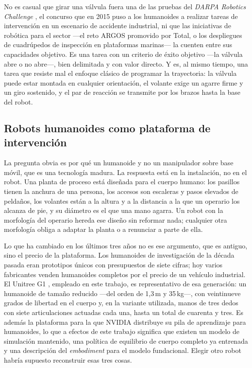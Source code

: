 No es casual que girar una válvula fuera una de las pruebas del \textit{DARPA Robotics Challenge}
\cite{krotkov2017drc}, el concurso que en 2015 puso a los humanoides a realizar tareas de
intervención en un escenario de accidente industrial, ni que las iniciativas de robótica para el
sector —el reto ARGOS promovido por Total, o los despliegues de cuadrúpedos de inspección en
plataformas marinas— la cuenten entre sus capacidades objetivo. Es una tarea con un criterio de
éxito objetivo —la válvula abre o no abre—, bien delimitada y con valor directo. Y es, al mismo
tiempo, una tarea que resiste mal el enfoque clásico de programar la trayectoria: la válvula puede
estar montada en cualquier orientación, el volante exige un agarre firme y un giro sostenido, y el
par de reacción se transmite por los brazos hasta la base del robot.

\subsection{Robots humanoides como plataforma de intervención}

La pregunta obvia es por qué un humanoide y no un manipulador sobre base móvil, que es una
tecnología madura. La respuesta está en la instalación, no en el robot. Una planta de proceso está
diseñada para el cuerpo humano: los pasillos tienen la anchura de una persona, los accesos son
escaleras y pasos elevados de peldaños, los volantes están a la altura y a la distancia a la que un
operario los alcanza de pie, y su diámetro es el que una mano agarra. Un robot con la morfología del
operario hereda ese diseño sin reformar nada; cualquier otra morfología obliga a adaptar la planta o
a renunciar a parte de ella.

Lo que ha cambiado en los últimos tres años no es ese argumento, que es antiguo, sino el precio de la
plataforma. Los humanoides de investigación de la década pasada eran prototipos únicos con
presupuestos de siete cifras; hoy varios fabricantes venden humanoides completos por el precio de un
vehículo industrial. El Unitree G1 \cite{unitree_g1}, empleado en este trabajo, es representativo de
esa generación: un humanoide de tamaño reducido —del orden de 1,3\,m y 35\,kg—, con veintinueve
grados de libertad en el cuerpo y, en la variante utilizada, manos de tres dedos con siete
articulaciones actuadas cada una, hasta un total de cuarenta y tres. Es además la plataforma para la
que NVIDIA distribuye su pila de aprendizaje para humanoides, lo que a efectos de este trabajo
significa que existen un modelo de simulación mantenido, una política de equilibrio de cuerpo
completo ya entrenada y una descripción del \textit{embodiment} para el modelo fundacional. Elegir
otro robot habría supuesto reconstruir esas tres cosas.

